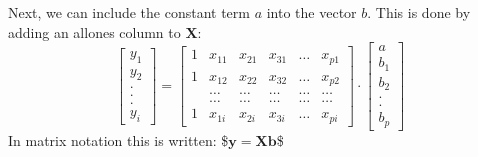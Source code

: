 \documentclass[letterpaper,10pt,english]{jupyterBook}
\begin{document}
\sphinxAtStartPar
Next, we can include the constant term \(a\) into the vector \(b\). This is done by adding an all\sphinxhyphen{}ones column to \(\mathbf{X}\):
\begin{equation*}
     \begin{bmatrix}
      y_1\\
      y_2\\
      .  \\
      .  \\
      .  \\
      y_i
    \end{bmatrix}
    =
    \begin{bmatrix}
      1& x_{11} & x_{21} & x_{31} & \ldots & x_{p1}\\
      1 &  x_{12} & x_{22} & x_{32} & \ldots & x_{p2}\\
      &\ldots&\ldots&\ldots&\ldots&\ldots\\
      &\ldots&\ldots&\ldots&\ldots&\ldots\\
      1& x_{1i} & x_{2i} & x_{3i} & \ldots & x_{pi}
    \end{bmatrix}
    \cdot
    \begin{bmatrix}
      a\\
      b_1\\
      b_2\\
      .\\
      .\\
      b_p
    \end{bmatrix}
  \end{equation*}
\sphinxAtStartPar
In matrix notation this is written:
\$\(\mathbf{y} = \mathbf{X}\mathbf{b}\)\$
\end{document}
